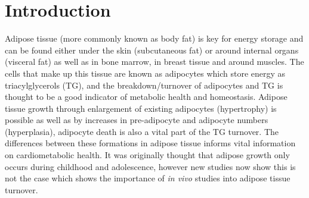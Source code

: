 \documentclass[class=article, crop=false]{standalone}
\begin{document}
 
\label{Chap:Lipid}

\section{Introduction}

Adipose tissue (more commonly known as body fat) is key for energy storage and can be found either under the skin (subcutaneous fat) or around internal organs (visceral fat) as well as in bone marrow, in breast tissue and around muscles. The cells that make up this tissue are known as adipocytes which store energy as triacylglycerols (TG), and the breakdown/turnover of adipocytes and TG is thought to be a good indicator of metabolic health and homeostasis. Adipose tissue growth through enlargement of existing adipocytes (hypertrophy) is possible as well as by increases in pre-adipocyte and adipocyte numbers (hyperplasia), adipocyte death is also a vital part of the TG turnover\cite{White2019DynamicsDisease}. The differences between these formations in adipose tissue informs vital information on cardiometabolic health\cite{Carnethon2002Serum19871998}. It was originally thought that adipose growth only occurs during childhood and adolescence\cite{Salans1973StudiesPatients}, however new studies now show this is not the case\cite{White2016DifferencesWomen} which shows the importance of \textit{in vivo} studies into adipose tissue turnover.
\end{document}

